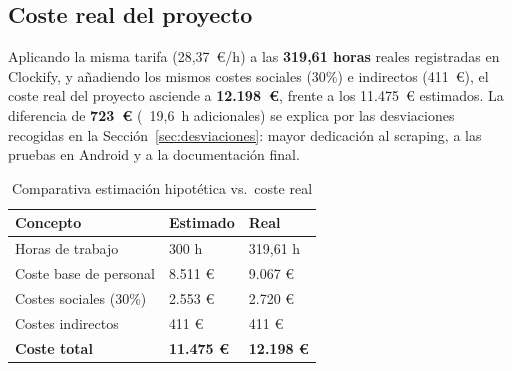 \subsection{Coste real del proyecto}

Aplicando la misma tarifa (28,37~€/h) a las \textbf{319,61 horas} reales registradas en Clockify, y añadiendo los mismos costes sociales (30\%) e indirectos (411~€), el coste real del proyecto asciende a \textbf{12.198~€}, frente a los 11.475~€ estimados. La diferencia de \textbf{723~€} (~19,6~h adicionales) se explica por las desviaciones recogidas en la Sección~\ref{sec:desviaciones}: mayor dedicación al scraping, a las pruebas en Android y a la documentación final.

\begin{table}[H]
\centering
\caption{Comparativa estimación hipotética vs.\ coste real}
\label{tab:coste_real_total}
\begin{tabular}{p{5.5cm}p{3cm}p{3cm}}
\toprule
\textbf{Concepto} & \textbf{Estimado} & \textbf{Real} \\
\midrule
Horas de trabajo & 300 h & 319,61 h \\
Coste base de personal & 8.511 € & 9.067 € \\
Costes sociales (30\%) & 2.553 € & 2.720 € \\
Costes indirectos & 411 € & 411 € \\
\midrule
\textbf{Coste total} & \textbf{11.475 €} & \textbf{12.198 €} \\
\bottomrule
\end{tabular}
\end{table}
